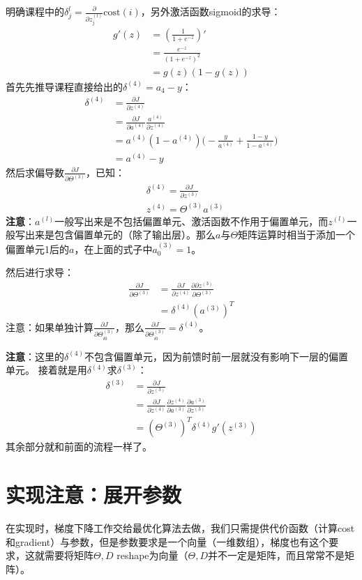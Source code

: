 \documentclass[../main.tex]{subfiles}
\begin{document}
明确课程中的\(δ^{l}_j=\frac{∂}{∂z^{(l)}_j}\mathrm{cost}(i)\)，另外激活函数sigmoid的求导：
\begin{align*}
    g'(z) & = (\frac{1}{1+e^{-z}})'       \\
          & = \frac{e^{-z}}{(1+e^{-z})^2} \\
          & = g(z)(1- g(z))
\end{align*}
首先先推导课程直接给出的\(δ^{(4)} = a_4 - y\)：
\begin{align*}
    δ^{(4)} & = \frac{∂J}{∂z^{(4)}}                                                    \\
            & = \frac{∂J}{∂a^{(4)}}\frac{a^{(4)}}{∂z^{(4)}}                            \\
            & = a^{(4)}(1-a^{(4)})\big(-\frac{y}{a^{(4)}} + \frac{1-y}{1-a^{(4)}}\big) \\
            & = a^{(4)} -y
\end{align*}
然后求偏导数\(\frac{∂J}{∂Θ^{(3)}}\)，已知：
\begin{align*}
     & δ^{(4)} = \frac{∂J}{∂z^{(3)}} \\
     & z^{(4)} = Θ^{(3)}a^{(3)}
\end{align*}
\textbf{注意}：\(a^{(l)}\)一般写出来是不包括偏置单元、激活函数不作用于偏置单元，而\(z^{(l)}\)一般写出来是包含偏置单元的（除了输出层）。那么\(a\)与\(Θ\)矩阵运算时相当于添加一个偏置单元1后的\(a\)，在上面的式子中\(a^{(3)}_0=1\)。

然后进行求导：
\begin{align*}
    \frac{∂J}{∂Θ^{(3)}} & = \frac{∂J}{∂z^{(4)}} \frac{∂∂z^{(3)}}{∂Θ^{(3)}} \\
                        & =  δ^{(4)} (a^{(3)})^T
\end{align*}
注意：如果单独计算\(\frac{∂J}{∂Θ^{(3)}_{i0}}\)，那么\(\frac{∂J}{∂Θ^{(3)}_{i0}}=δ^{(4)}\)。

\textbf{注意}：这里的\(δ^{(4)}\)不包含偏置单元，因为前馈时前一层就没有影响下一层的偏置单元。
接着就是用\(δ^{(4)}\)求\(δ^{(3)}\)：
\begin{align*}
    δ^{(3)} & = \frac{∂J}{∂z^{(3)}}                                                   \\
            & = \frac{∂J}{∂z^{(4)}}\frac{∂z^{(4)}}{∂a^{(3)}}\frac{∂a^{(3)}}{∂z^{(3)}} \\
            & = (Θ^{(3)})^Tδ^{(4)}g'(z^{(3)})
\end{align*}
其余部分就和前面的流程一样了。

\section{实现注意：展开参数}
在实现时，梯度下降工作交给最优化算法去做，我们只需提供代价函数（计算cost和gradient）与参数，但是参数要求是一个向量（一维数组），梯度也有这个要求，这就需要将矩阵\(Θ, D\) reshape为向量（\(Θ, D\)并不一定是矩阵，而且常常不是矩阵）。
\end{document}
